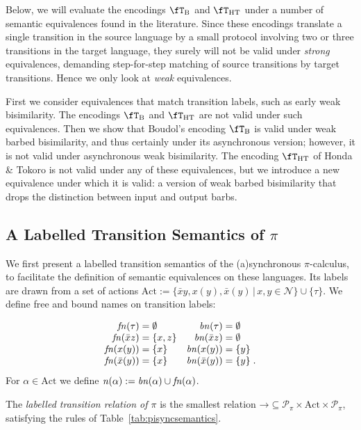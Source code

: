 \documentclass[runningheads]{llncs}
\newcommand{\tab}[1]{Table~\ref{tab:#1}}
\newcommand{\T}{\mathcal{P}}             %
\newcommand{\bbT}{\T}
\newcommand{\fTHT}{\fT_{\textrm{HT}}}       %
\newcommand{\n}{{\it n}}                 %
\newcommand{\bn}{{\it bn}}               %
\newcommand{\fn}{{\it fn}}               %
\newcommand{\pims}{\pi}
\newcommand{\Act}{\mathrm{Act}}
\begin{document}
Below, we will evaluate the encodings $\fT_{\rm B}$ and $\fT_{\rm HT}$ under a number of semantic
equivalences found in the literature. Since these encodings translate a single transition in the
source language by a small protocol involving two or three transitions in the target language, they
surely will not be valid under \emph{strong} equivalences, demanding step-for-step matching of
source transitions by target transitions. Hence we only look at \emph{weak} equivalences.

First we consider equivalences that match transition labels, such as early weak bisimilarity.
The encodings $\fT_{\rm B}$ and $\fT_{\rm HT}$ are not valid under such equivalences.
Then we show that Boudol's encoding $\fT_{\rm B}$ is valid under weak barbed bisimilarity, and thus certainly under
its asynchronous version; however, it is not valid under asynchronous weak bisimilarity.
The encoding $\fTHT$ of Honda \& Tokoro is not valid under any of these equivalences,
but we introduce a new equivalence under which it is valid: a version of weak barbed bisimilarity
that drops the distinction between input and output barbs.

\subsection{A Labelled Transition Semantics of \texorpdfstring{$\pi$}{the pi-calculus}}\label{sec:processcalculi}

We first present a labelled transition semantics of the (a)synchronous $\pi$-calculus,
to facilitate the definition of semantic equivalences on these languages.
Its labels are drawn from
a set of actions $\Act := \{ \bar x y, x(y), \bar x(y) \,|\, x, y \in \mathcal N \} \cup \{ \tau \}$.
We define free and bound names on transition labels:\vspace{-4ex}

\begin{align*}
\fn(\tau)       &= \emptyset &\bn(\tau)       &= \emptyset \\[-3pt]
\fn(\bar{x}z)   &= \{x,z\}   &\bn(\bar{x}z)   &= \emptyset \\[-3pt]
\fn(x(y))       &= \{x\}     &\bn(x(y))       &= \{y\} \\[-3pt]
\fn(\bar{x}(y)) &= \{x\}    &\bn(\bar{x}(y)) &= \{y\}\;.
\end{align*}
For $\alpha\in\Act$ we define $\n(\alpha) := \bn(\alpha) \cup \fn(\alpha)$.

\begin{definition}\rm\label{df:syncltssemantics}
The {\em labelled transition relation of $\pims$} is the
smallest relation $\mathord{\longrightarrow} \subseteq \bbT_{\pims} \times \Act \times \bbT_{\pims}$,
satisfying the rules of \tab{pisyncsemantics}.
\end{definition}
\end{document}
